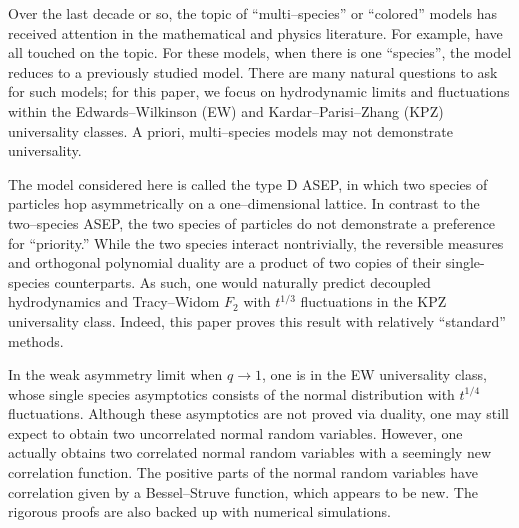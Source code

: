 \documentclass[11pt]{article}
\theoremstyle{plain}
\theoremstyle{definition}
\theoremstyle{remark}
\begin{document}
Over the last decade or so, the topic of ``multi--species'' or ``colored'' models has received attention in the mathematical and physics literature. For example,    \cite{Spohn14, FSS, PSSS, SpohnStoltz, PSS, MendlSpohn, vanBeijeren, DDSMS, SpohnReview, FunakiHoshino, KupiainenMarcozzi, ButelmannMF,
  CdGHSU, NejjarMixing, FerrariNejjar, NejjarHard, ACH, BalazsSeppalainen, FerrariMartin, ANP, BorodinWheeler, AggarwalBorodin, FerrariKipnis,
  CasiniGR, FKZ, CGMO, KuanZhou, GroeneveltWagenaar, Wagenaar, AyalaZimmer, DaCunhaSasada, CCGO, CasiniFG, dNBD, Doyon, DPSY, DEHP,
  CorteelWilliams, CdGW, KMO, Martin, RDKKS, SKP, WCS} have all touched on the topic. For these models, when there is one ``species'', the model reduces to a previously studied model. There are many natural questions to ask for such models; for this paper, we focus on hydrodynamic limits and fluctuations within the Edwards--Wilkinson (EW) and Kardar--Parisi--Zhang (KPZ) universality classes. A priori, multi--species models may not demonstrate universality. 
  
  The model considered here is called the type D ASEP, in which two species of particles hop asymmetrically on a one--dimensional lattice. In contrast to the two--species ASEP, the two species of particles do not demonstrate a preference for ``priority.'' While the two species interact nontrivially, the reversible measures and orthogonal polynomial duality are a product of two copies of their single-species counterparts.  As such, one would naturally predict decoupled hydrodynamics and Tracy--Widom $F_2$ with $t^{1/3}$ fluctuations in the KPZ universality class. Indeed, this paper proves this result with relatively ``standard'' methods. 
  
 In the weak asymmetry limit when $q\rightarrow 1$, one is in the EW universality class, whose single species asymptotics consists of the normal distribution with $t^{1/4}$ fluctuations. Although these asymptotics are not proved via duality, one may still expect to obtain two uncorrelated normal random variables. However, one actually obtains two correlated normal random variables with a seemingly new correlation function. The positive parts of the normal random variables have correlation given by a Bessel--Struve function, which appears to be new. The rigorous proofs are also backed up with numerical simulations.
  
  
\end{document}

